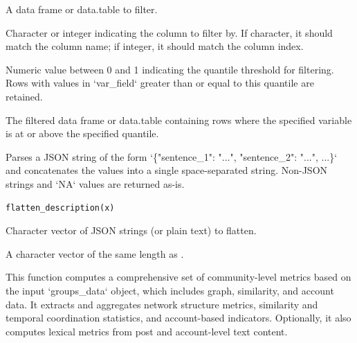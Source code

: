 \documentclass[a4paper]{book}
\begin{document}
\begin{Arguments}
\begin{ldescription}
\item[\code{df}] A data frame or data.table to filter.

\item[\code{var\_field}] Character or integer indicating the column to filter by. If character, it should match the column name; 
if integer, it should match the column index.

\item[\code{probs}] Numeric value between 0 and 1 indicating the quantile threshold for filtering. Rows with values 
in `var\_field` greater than or equal to this quantile are retained.
\end{ldescription}
\end{Arguments}
%
\begin{Value}
The filtered data frame or data.table containing rows where the specified variable is at or above the specified quantile.
\end{Value}
%
\begin{Description}
Parses a JSON string of the form `\{"sentence\_1": "...", "sentence\_2": "...", ...\}`
and concatenates the values into a single space-separated string. Non-JSON strings
and `NA` values are returned as-is.
\end{Description}
%
\begin{Usage}
\begin{verbatim}
flatten_description(x)
\end{verbatim}
\end{Usage}
%
\begin{Arguments}
\begin{ldescription}
\item[\code{x}] Character vector of JSON strings (or plain text) to flatten.
\end{ldescription}
\end{Arguments}
%
\begin{Value}
A character vector of the same length as .
\end{Value}
%
\begin{Description}
This function computes a comprehensive set of community-level metrics based on the 
input `groups\_data` object, which includes graph, similarity, and account data. It 
extracts and aggregates network structure metrics, similarity and temporal coordination 
statistics, and account-based indicators. Optionally, it also computes lexical metrics 
from post and account-level text content.
\end{Description}
\end{document}
